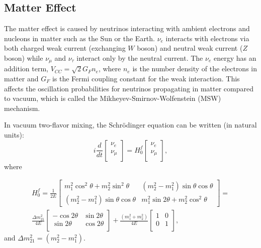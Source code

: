 \subsection{Matter Effect}

The matter effect is caused by neutrinos interacting with ambient electrons and nucleons in matter such as the Sun or the Earth. $\nu_e$ interacts with electrons via both charged weak current (exchanging $W$ boson) and neutral weak current ($Z$ boson) while $\nu_\mu$ and $\nu_\tau$ interact only by the neutral current. The $\nu_e$ energy has an addition term, $V_{CC} =\sqrt2G_Fn_e$, where $n_e$ is the number density of the electrons in matter and $G_F$ is the Fermi coupling constant for the weak interaction. This affects the oscillation probabilities for neutrinos propagating in matter compared to vacuum, which is called the Mikheyev-Smirnov-Wolfenstein (MSW) mechanism\cite{smirnov2016solar,smirnov2005msw}.

In vacuum two-flavor mixing, the Schr\"{o}dinger equation can be written (in natural units)\cite{xing2011neutrinos}:
\begin{equation}\label{eq:2flavor_simple}
	i\frac{d}{dt}\begin{bmatrix}
		\nu_e\\
		\nu_\mu\\
	\end{bmatrix}
	=
	H^f_0
	\begin{bmatrix}
		\nu_e\\
		\nu_\mu\\
	\end{bmatrix},
\end{equation}
where 

\begin{equation} \label{eq:H0f}
\begin{aligned}
 H^f_0 = \frac{1}{2E}\begin{bmatrix}m^2_1\cos^2\theta+m^2_2\sin^2\theta & (m^2_2-m^2_1)\sin\theta\cos\theta \\ (m^2_2-m^2_1)\sin\theta\cos\theta & m^2_1\sin2\theta+m^2_2\cos^2\theta\end{bmatrix} =
\\
\frac{\Delta m_{21}^2}{4E}\begin{bmatrix}
	-\cos 2\theta & \sin 2\theta\\
	\sin 2\theta & \cos 2\theta\\
\end{bmatrix}+\frac{(m_1^2+m_2^2)}{4E}\begin{bmatrix}
	1 & 0\\
	0 &1\\
\end{bmatrix},
\end{aligned}
\end{equation}
and $\Delta m^2_{21}=(m^2_2 - m^2_1)$.

